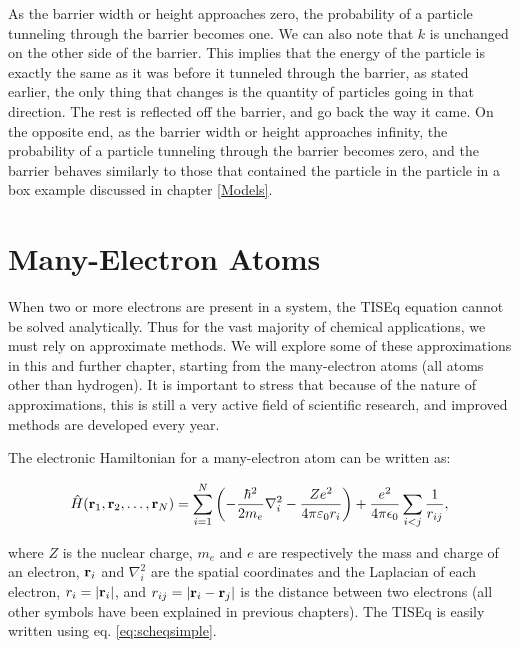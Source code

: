 \documentclass[
  9pt,
]{extbook}
\theoremstyle{definition}
\theoremstyle{definition}
\theoremstyle{definition}
\theoremstyle{remark}
\begin{document}
As the barrier width or height approaches zero, the probability of a particle tunneling through the barrier becomes one. We can also note that \(k\) is unchanged on the other side of the barrier. This implies that the energy of the particle is exactly the same as it was before it tunneled through the barrier, as stated earlier, the only thing that changes is the quantity of particles going in that direction. The rest is reflected off the barrier, and go back the way it came. On the opposite end, as the barrier width or height approaches infinity, the probability of a particle tunneling through the barrier becomes zero, and the barrier behaves similarly to those that contained the particle in the particle in a box example discussed in chapter \ref{Models}.

\hypertarget{Atoms}{%
\chapter{Many-Electron Atoms}\label{Atoms}}

When two or more electrons are present in a system, the TISEq equation cannot be solved analytically. Thus for the vast majority of chemical applications, we must rely on approximate methods. We will explore some of these approximations in this and further chapter, starting from the many-electron atoms (all atoms other than hydrogen). It is important to stress that because of the nature of approximations, this is still a very active field of scientific research, and improved methods are developed every year.

The electronic Hamiltonian for a many-electron atom can be written as:

\begin{equation}
\hat{H}({\bf r}_1,{\bf r}_2,\ldots,{\bf r}_N)=\sum_{i=1}^N \left(-{\frac {\hbar ^{2}}{2m_e }}\nabla_{i}^{2}-{\frac {Ze^{2}}{4\pi \varepsilon _{0}r_{i}}} \right)+{\frac {e^{2}}{4\pi \epsilon _{0}}}\sum_{i<j}\frac{1}{r_{ij}},
\label{eq:atom1}
\end{equation}

where \(Z\) is the nuclear charge, \(m_e\) and \(e\) are respectively the mass and charge of an electron, \({\bf r}_i\) and \(\nabla_i^2\) are the spatial coordinates and the Laplacian of each electron, \(r_{i}=|{\bf r}_i|\), and \(r_{{ij}}=|{\bf r}_i-{\bf r}_j|\) is the distance between two electrons (all other symbols have been explained in previous chapters). The TISEq is easily written using eq. \eqref{eq:scheqsimple}.
\end{document}
